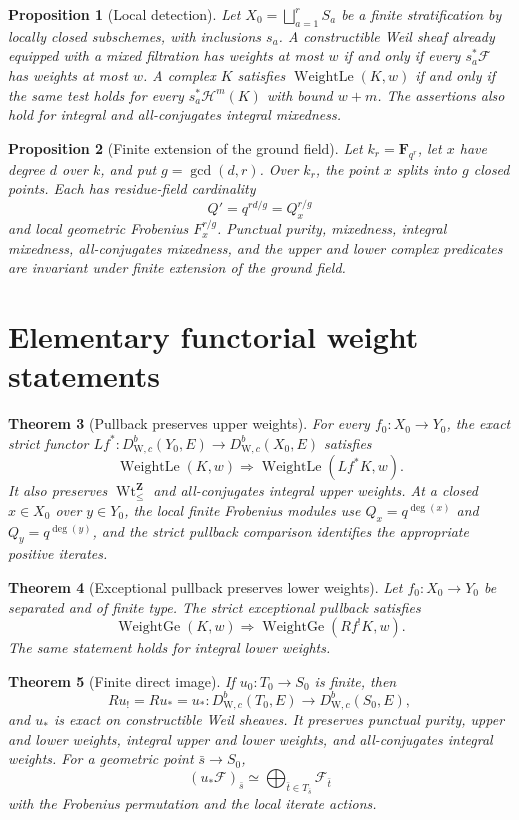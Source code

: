 \documentclass[10pt]{article}
\newtheorem{theorem}{Theorem}[section]
\newtheorem{proposition}[theorem]{Proposition}
\theoremstyle{definition}
\newcommand{\WeilD}{D^b_{\mathrm W,c}}
\newcommand{\WtLe}{\operatorname{WeightLe}}
\newcommand{\WtGe}{\operatorname{WeightGe}}
\newcommand{\IntWtLe}{\operatorname{Wt}^{\mathbf Z}_{\leq}}
\begin{document}
\begin{proposition}[Local detection]
Let \(X_0=\bigsqcup_{a=1}^rS_a\) be a finite stratification by locally
closed subschemes, with inclusions \(s_a\).  A constructible Weil sheaf
already equipped with a mixed filtration has weights at most \(w\) if and
only if every \(s_a^*\mathcal F\) has weights at most \(w\).  A complex
\(K\) satisfies \(\WtLe(K,w)\) if and only if the same test holds for every
\(s_a^*\mathcal H^m(K)\) with bound \(w+m\).  The assertions also hold for
integral and all-conjugates integral mixedness.
\end{proposition}

\begin{proposition}[Finite extension of the ground field]
Let \(k_r=\mathbf F_{q^r}\), let \(x\) have degree \(d\) over \(k\), and
put \(g=\gcd(d,r)\).  Over \(k_r\), the point \(x\) splits into \(g\)
closed points.  Each has residue-field cardinality
\[
 Q'=q^{rd/g}=Q_x^{r/g}
\]
and local geometric Frobenius \(F_x^{r/g}\).  Punctual purity, mixedness, integral mixedness, all-conjugates
mixedness, and the upper and lower complex predicates are invariant under
finite extension of the ground field.
\end{proposition}

\section{Elementary functorial weight statements}

\begin{theorem}[Pullback preserves upper weights]
For every \(f_0:X_0\to Y_0\), the exact strict functor
\(Lf^*:\WeilD(Y_0,E)\to\WeilD(X_0,E)\) satisfies
\[
             \WtLe(K,w)\Longrightarrow\WtLe(Lf^*K,w).
\]
It also preserves \(\IntWtLe\) and all-conjugates integral upper weights.
At a closed \(x\in X_0\) over \(y\in Y_0\), the local finite Frobenius
modules use \(Q_x=q^{\deg(x)}\) and \(Q_y=q^{\deg(y)}\), and the strict
pullback comparison identifies the appropriate positive iterates.
\end{theorem}

\begin{theorem}[Exceptional pullback preserves lower weights]
Let \(f_0:X_0\to Y_0\) be separated and of finite type.  The strict
exceptional pullback satisfies
\[
             \WtGe(K,w)\Longrightarrow\WtGe(Rf^!K,w).
\]
The same statement holds for integral lower weights.
\end{theorem}

\begin{theorem}[Finite direct image]
If \(u_0:T_0\to S_0\) is finite, then
\[
 Ru_!=Ru_*=u_*:\WeilD(T_0,E)\longrightarrow\WeilD(S_0,E),
\]
and \(u_*\) is exact on constructible Weil sheaves.  It preserves punctual
purity, upper and lower weights, integral upper and lower weights, and
all-conjugates integral weights.  For a geometric point \(\bar s\to S_0\),
\[
 (u_*\mathcal F)_{\bar s}
 \simeq\bigoplus_{\bar t\in T_{\bar s}}\mathcal F_{\bar t}
\]
with the Frobenius permutation and the local iterate actions.
\end{theorem}
\end{document}
